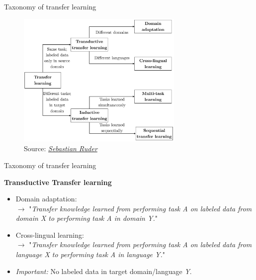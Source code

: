 \begin{frame}{Taxonomy of transfer learning \href{https://ruder.io/thesis/}{}}
	\begin{figure}
		\centering
		\includegraphics[width = 8cm]{figure/transfer_learning_taxonomy-1.png}\\ 
		\footnotesize{Source:} \href{https://ruder.io/thesis/}{\footnotesize \it Sebastian Ruder}
	\end{figure}
\end{frame}


\begin{frame}{Taxonomy of transfer learning \href{https://ruder.io/thesis/}{}}

\vfill

	\textbf{Transductive Transfer learning}

	\begin{itemize}
		\item Domain adaptation:\\
					$\rightarrow$ "\textit{Transfer knowledge learned from performing task A on labeled data from domain X to performing task A in domain Y.}"\\\mbox{}
		\item Cross-lingual learning:\\
					$\rightarrow$ "\textit{Transfer knowledge learned from performing task A on labeled data from language X to performing task A in language Y.}"\\\mbox{}
		\item \textit{Important:} No labeled data in target domain/language \textit{Y}.
	\end{itemize}
	
\vfill

\end{frame}

